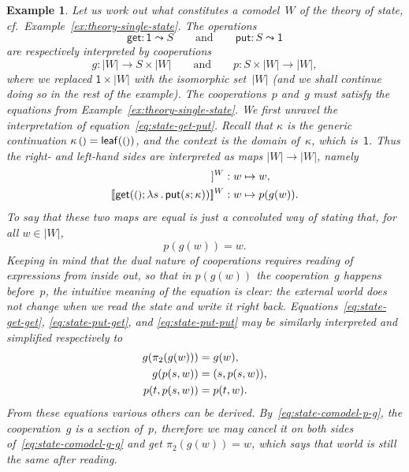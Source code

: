 \documentclass{amsart}
\newcommand{\carrier}[1]{|#1|} %
\newcommand{\lam}[1]{\lambda #1 \,.\,}
\newcommand{\leaf}[1]{\mathsf{leaf}(#1)} %
\newcommand{\opdecl}[3]{#1 : #2 \leadsto #3} %
\newcommand{\one}{\mathsf{1}} %
\newcommand{\unit}{{\text{\small$()$}}} %
\newcommand{\sem}[1]{[\![#1]\!]} %
\newcommand{\kode}[1]{\mathsf{#1}}
\newcommand{\opcall}[3]{\kode{#1}(#2; #3)}
\newtheorem{example}[definition]{Example}
\begin{document}
\begin{example}
  Let us work out what constitutes a comodel~$W$ of the theory of state, cf.\
  Example~\ref{ex:theory-single-state}. The operations
  \begin{equation*}
    \opdecl{\kode{get}}{\one}{S}
    \qquad\text{and}\qquad
    \opdecl{\kode{put}}{S}{\one}
  \end{equation*}
  are respectively interpreted by cooperations
  \begin{equation*}
    g : \carrier{W} \to S \times \carrier{W}
    \qquad\text{and}\qquad
    p : S \times \carrier{W} \to \carrier{W},
  \end{equation*}
  where we replaced $\one \times \carrier{W}$ with the isomorphic
  set~$\carrier{W}$ (and we shall continue doing so in the rest of the example).
  The cooperations~$p$ and~$g$ must satisfy the equations from
  Example~\ref{ex:theory-single-state}. We first unravel the interpretation of
  equation~\eqref{eq:state-get-put}. Recall that $\kappa$ is the generic
  continuation $\kappa \, \unit = \leaf{\unit}$, and the context is the domain
  of~$\kappa$, which is~$\one$. Thus the right- and left-hand sides are
  interpreted as maps $\carrier{W} \to \carrier{W}$, namely
  \begin{align*}
    \sem{\kappa\,\unit}^W &: w \mapsto w,\\
    \sem{\opcall{get}{\unit}{\lam{s} \opcall{put}{s}{\kappa}}}^W &: w \mapsto p(g(w)).
  \end{align*}
  To say that these two maps are equal is just a convoluted way of stating that,
  for all $w \in |W|$,
  \begin{equation}
    \label{eq:state-comodel-p-g}
    p(g(w)) = w.
  \end{equation}
  Keeping in mind that the dual nature of cooperations requires reading of
  expressions from inside out, so that in $p(g(w))$ the cooperation~$g$ happens
  before~$p$, the intuitive meaning of the equation is clear: the external world
  does not change when we read the state and write it right back.
  Equations~\eqref{eq:state-get-get}, \eqref{eq:state-put-get}, and
  \eqref{eq:state-put-put} may be similarly interpreted and simplified
  respectively to
  \begin{align}
    \label{eq:state-comodel-g-g}
    g(\pi_2 (g (w))) &= g(w),
    \\
    \notag
    g(p(s, w)) &= (s, p (s, w)),
    \\
    \notag
    p(t, p(s, w)) &= p(t, w).
  \end{align}
  From these equations various others can be derived.
  By~\eqref{eq:state-comodel-p-g}, the cooperation~$g$ is a section of~$p$,
  therefore we may cancel it on both sides of~\eqref{eq:state-comodel-g-g} and
  get $\pi_2(g(w)) = w$, which says that world is still the same after reading.
\end{example}
\end{document}
